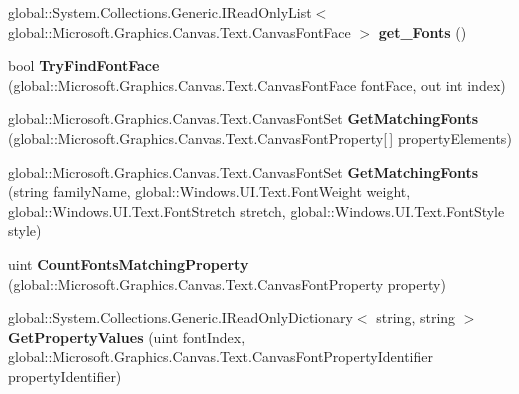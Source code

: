 \begin{DoxyCompactItemize}
global\+::\+System.\+Collections.\+Generic.\+I\+Read\+Only\+List$<$ global\+::\+Microsoft.\+Graphics.\+Canvas.\+Text.\+Canvas\+Font\+Face $>$ {\bfseries get\+\_\+\+Fonts} ()
\item 
\mbox{\label{class_microsoft_1_1_graphics_1_1_canvas_1_1_text_1_1_canvas_font_set_a13e365d13ed355de227da7a3145714db}} 
bool {\bfseries Try\+Find\+Font\+Face} (global\+::\+Microsoft.\+Graphics.\+Canvas.\+Text.\+Canvas\+Font\+Face font\+Face, out int index)
\item 
\mbox{\label{class_microsoft_1_1_graphics_1_1_canvas_1_1_text_1_1_canvas_font_set_a4a5e120b147d6554e916b380746b72a5}} 
global\+::\+Microsoft.\+Graphics.\+Canvas.\+Text.\+Canvas\+Font\+Set {\bfseries Get\+Matching\+Fonts} (global\+::\+Microsoft.\+Graphics.\+Canvas.\+Text.\+Canvas\+Font\+Property\mbox{[}$\,$\mbox{]} property\+Elements)
\item 
\mbox{\label{class_microsoft_1_1_graphics_1_1_canvas_1_1_text_1_1_canvas_font_set_a1e65e79bf7c6294505e0162beef419fd}} 
global\+::\+Microsoft.\+Graphics.\+Canvas.\+Text.\+Canvas\+Font\+Set {\bfseries Get\+Matching\+Fonts} (string family\+Name, global\+::\+Windows.\+U\+I.\+Text.\+Font\+Weight weight, global\+::\+Windows.\+U\+I.\+Text.\+Font\+Stretch stretch, global\+::\+Windows.\+U\+I.\+Text.\+Font\+Style style)
\item 
\mbox{\label{class_microsoft_1_1_graphics_1_1_canvas_1_1_text_1_1_canvas_font_set_a1b220e58fc624526327b3d8faccceecf}} 
uint {\bfseries Count\+Fonts\+Matching\+Property} (global\+::\+Microsoft.\+Graphics.\+Canvas.\+Text.\+Canvas\+Font\+Property property)
\item 
\mbox{\label{class_microsoft_1_1_graphics_1_1_canvas_1_1_text_1_1_canvas_font_set_a814e7ae485933c4e7fbf68602ad588b9}} 
global\+::\+System.\+Collections.\+Generic.\+I\+Read\+Only\+Dictionary$<$ string, string $>$ {\bfseries Get\+Property\+Values} (uint font\+Index, global\+::\+Microsoft.\+Graphics.\+Canvas.\+Text.\+Canvas\+Font\+Property\+Identifier property\+Identifier)

\end{DoxyCompactItemize}
